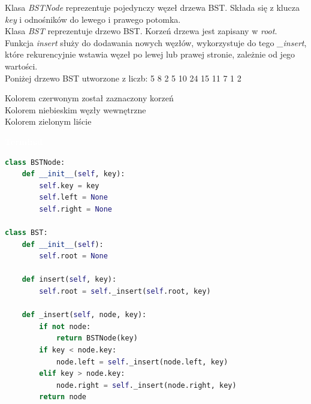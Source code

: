 \documentclass{article}
\begin{document}
	\begin{multicols}{2}
		\noindent 
		Klasa \textit{BSTNode} reprezentuje pojedynczy węzeł drzewa BST. Składa się z klucza \textit{key} i odnośników do lewego i prawego potomka. \\ Klasa \textit{BST} reprezentuje drzewo BST. Korzeń drzewa jest zapisany w \textit{root}. Funkcja \textit{insert} służy do dodawania nowych węzłów, wykorzystuje do tego \textit{\_insert}, które rekurencyjnie wstawia węzeł po lewej lub prawej stronie, zależnie od jego wartości. 
		\vspace*{0.4cm}
		\noindent \\Poniżej drzewo BST utworzone z liczb: 5 8 2 5 10 24 15 11 7 1 2
		
		\noindent Kolorem czerwonym został zaznaczony korzeń \\
		Kolorem niebieskim węzły wewnętrzne \\
		Kolorem zielonym liście
		
		\vspace*{1cm}
		
		
		\begin{tcolorbox}[colback=black,colframe=gray!50!,arc=3mm,boxrule=0pt,left=0pt,right=0pt,width=\linewidth]
			\textcolor{white}{\textbf{\textsf{Terminal}}}\\
			
			\begin{lstlisting}[language=Python]
class BSTNode:
	def __init__(self, key):
		self.key = key
		self.left = None
		self.right = None

class BST:
	def __init__(self):
		self.root = None

	def insert(self, key):
		self.root = self._insert(self.root, key)

	def _insert(self, node, key):
		if not node:
			return BSTNode(key)
		if key < node.key:
			node.left = self._insert(node.left, key)
		elif key > node.key:
			node.right = self._insert(node.right, key)
		return node
			\end{lstlisting}
			
		\end{tcolorbox}
	\end{multicols}
	
\end{document}
